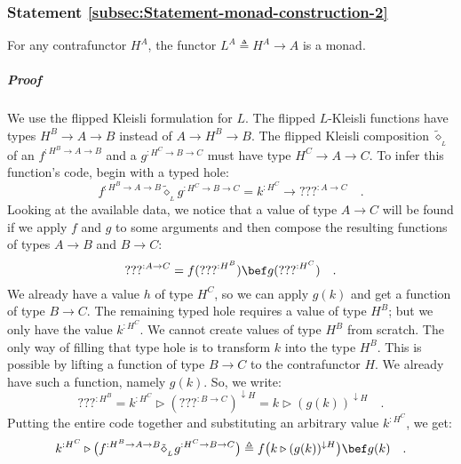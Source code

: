 \subsubsection{Statement \label{subsec:Statement-monad-construction-2}\ref{subsec:Statement-monad-construction-2}}

For any contrafunctor $H^{A}$, the functor $L^{A}\triangleq H^{A}\rightarrow A$
is a monad.

\subparagraph{Proof}

We use the flipped Kleisli formulation for $L$. The flipped $L$-Kleisli
functions have types $H^{B}\rightarrow A\rightarrow B$ instead of
$A\rightarrow H^{B}\rightarrow B$. The flipped Kleisli composition
$\tilde{\diamond}_{_{L}}$ of an $f^{:H^{B}\rightarrow A\rightarrow B}$
and a $g^{:H^{C}\rightarrow B\rightarrow C}$ must have type $H^{C}\rightarrow A\rightarrow C$.
To infer this function\textsf{'}s code, begin with a typed hole:
\[
f^{:H^{B}\rightarrow A\rightarrow B}\tilde{\diamond}_{_{L}}g^{:H^{C}\rightarrow B\rightarrow C}=k^{:H^{C}}\rightarrow\text{???}^{:A\rightarrow C}\quad.
\]
Looking at the available data, we notice that a value of type $A\rightarrow C$
will be found if we apply $f$ and $g$ to some arguments and then
compose the resulting functions of types $A\rightarrow B$ and $B\rightarrow C$:
\[
\text{???}^{:A\rightarrow C}=f(\text{???}^{:H^{B}})\bef g(\text{???}^{:H^{C}})\quad.
\]
We already have a value $h$ of type $H^{C}$, so we can apply $g(k)$
and get a function of type $B\rightarrow C$. The remaining typed
hole requires a value of type $H^{B}$; but we only have the value
$k^{:H^{C}}$. We cannot create values of type $H^{B}$ from scratch.
The only way of filling that type hole is to transform $k$ into the
type $H^{B}$. This is possible by lifting a function of type $B\rightarrow C$
to the contrafunctor $H$. We already have such a function, namely
$g(k)$. So, we write:
\[
\text{???}^{:H^{B}}=k^{:H^{C}}\triangleright(\text{???}^{:B\rightarrow C})^{\downarrow H}=k\triangleright(g(k))^{\downarrow H}\quad.
\]
Putting the entire code together and substituting an arbitrary value
$k^{:H^{C}}$, we get:
\begin{equation}
k^{:H^{C}}\triangleright\big(f^{:H^{B}\rightarrow A\rightarrow B}\tilde{\diamond}_{_{L}}g^{:H^{C}\rightarrow B\rightarrow C}\big)\triangleq f\big(k\triangleright(g(k))^{\downarrow H}\big)\bef g(k)\quad.\label{eq:def-of-Kleisli-for-exp-construction-h-a-a}
\end{equation}

